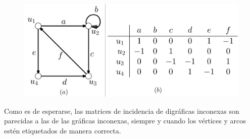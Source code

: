 \begin{figure}[h]
    \centering
    \includegraphics[scale=0.23]{img/imgchapter1/matrizdeincidenciadigrafica.jpg}
    \caption{}
    \label{fig:matrizdeincidenciadigrafica}
\end{figure}

Como es de esperarse, las matrices de incidencia de digráficas inconexas son parecidas a las de las gráficas inconexas, siempre y cuando los vértices y arcos estén etiquetados de manera correcta.






 
